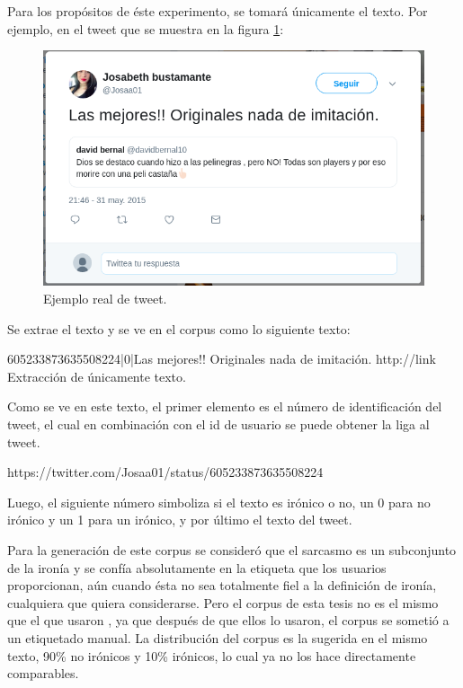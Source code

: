 \par Para los propósitos de éste experimento, se tomará únicamente el texto. Por ejemplo, en el tweet que se muestra en la figura \ref{fig:ejTweet}:
\begin{figure}[h!]
	\centering
	\includegraphics[width=\linewidth]{imagenes/ejemploTweet.png}
	\caption{Ejemplo real de tweet.}
	\label{fig:ejTweet}
\end{figure}

\par Se extrae el texto y se ve en el corpus como lo siguiente texto:

\begin{center}
	605233873635508224|0|Las mejores!! Originales nada de imitación. http://link \\[6pt]
	\footnotesize{Extracción de únicamente texto.}
\end{center}

\par Como se ve en este texto, el primer elemento es el número de identificación del tweet, el cual en combinación con el id de usuario se puede obtener la liga al tweet.

\vspace{5pt}
\begin{center}
	\par https://twitter.com/Josaa01/status/605233873635508224
\end{center}

\vspace{5pt}
\par Luego, el siguiente número simboliza si el texto es irónico o no, un 0 para no irónico y un 1 para un irónico, y por último el texto del tweet.

\par Para la generación de este corpus se consideró que el sarcasmo es un subconjunto de la ironía y se confía absolutamente en la etiqueta que los usuarios proporcionan, aún cuando ésta no sea totalmente fiel a la definición de ironía, cualquiera que quiera considerarse. Pero el corpus de esta tesis no es el mismo que el que usaron \textcite{lopez2016character}, ya que después de que ellos lo usaron, el corpus se sometió a un etiquetado manual. La distribución del corpus es la sugerida en el mismo texto, 90\% no irónicos y 10\% irónicos, lo cual ya no los hace directamente comparables.

